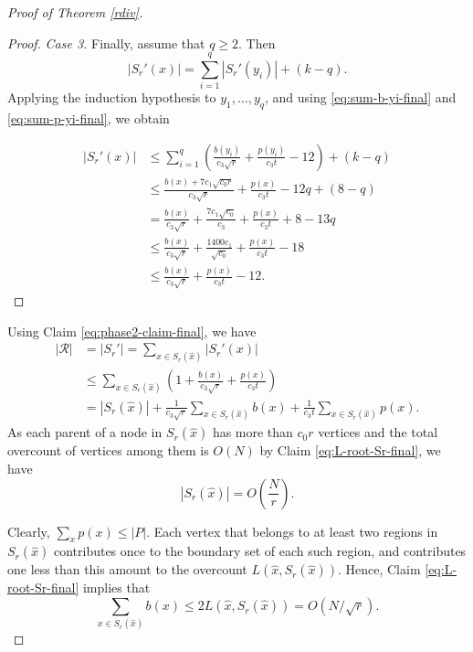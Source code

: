 \documentclass[11pt]{article}
\theoremstyle{plain}
\theoremstyle{definition}
\theoremstyle{remark}
\begin{document}
\begin{proof}[Proof of Theorem \ref{rdiv}]
\begin{proof}
 

\medskip 

\noindent \emph{Case 3.} Finally, assume that \(q\ge 2\). Then
\[
|S_r'(x)|
=
\sum_{i=1}^q |S_r'(y_i)|+(k-q).
\]
Applying the induction hypothesis to \(y_1,\dots,y_q\), and using
\eqref{eq:sum-b-yi-final} and \eqref{eq:sum-p-yi-final}, we obtain



\begin{align*}
|S_r'(x)|
  &\le
  \sum_{i=1}^q
  \left(
    \frac{b(y_i)}{c_3\sqrt r}
    +
    \frac{p(y_i)}{c_3 t}
    - 12
  \right)
  +(k-q) \\
  &\le
  \frac{b(x)+7c_1\sqrt{c_0r}}{c_3\sqrt r}
  +
  \frac{p(x)}{c_3 t}
  - 12q
  +(8-q) \\
  &=
  \frac{b(x)}{c_3\sqrt r}
  +
  \frac{7c_1\sqrt{c_0}}{c_3}
  +
  \frac{p(x)}{c_3 t}
  +
  8
  - 13q \\
  &\le
  \frac{b(x)}{c_3\sqrt r}
  +
  \frac{1400c_1}{\sqrt{c_0}}
  +
  \frac{p(x)}{c_3 t}
  - 18
  \\
  &\le
  \frac{b(x)}{c_3\sqrt r}
  +
  \frac{p(x)}{c_3 t}
  - 12.
\end{align*} \end{proof}






















Using Claim \ref{eq:phase2-claim-final}, we have
\begin{align*}
|\mathcal R|
  &= |S_r'|
   = \sum_{x\in S_r(\hat x)} |S_r'(x)| \\
  &\le \sum_{x\in S_r(\hat x)}
     \left(
       1+\frac{b(x)}{c_3\sqrt r}+\frac{p(x)}{c_3t}
     \right) \\
  &= |S_r(\hat x)|
     + \frac{1}{c_3\sqrt r}\sum_{x\in S_r(\hat x)} b(x)
     + \frac{1}{c_3t}\sum_{x\in S_r(\hat x)} p(x).
\end{align*}
As each parent of a node in \(S_r(\hat x)\) has more than \(c_0r\) vertices and the total overcount of vertices among them is $O(N)$ by Claim \ref{eq:L-root-Sr-final}, we have
\[
|S_r(\hat x)|=O\!\left(\frac{N}{r}\right).
\]

\noindent Clearly, $\sum_x p(x) \leq |P|$. Each vertex that belongs to at least two regions in \(S_r(\hat x)\) contributes once to the boundary set of each such region, and contributes one less than this amount to the overcount \(L(\hat x,S_r(\hat x))\). Hence, Claim \ref{eq:L-root-Sr-final} implies that
\[
\sum_{x\in S_r(\hat x)} b(x)\le 2L(\hat x,S_r(\hat x)) = O(N/\sqrt{r}).
\]


\end{proof}
\end{document}
